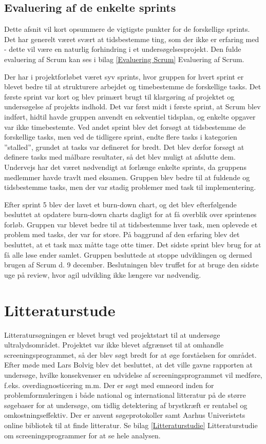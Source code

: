 \subsection{Evaluering af de enkelte sprints} 
Dette afsnit vil kort opsummere de vigtigste punkter for de forskellige sprints. Det har generelt været svært at tidsbestemme ting, som der ikke er erfaring med - dette vil være en naturlig forhindring i et undersøgelsesprojekt. Den fulde evaluering af Scrum kan ses i bilag \ref{Evaluering Scrum} Evaluering af Scrum.

Der har i projektforløbet været syv sprints, hvor gruppen for hvert sprint er blevet bedre til at strukturere arbejdet og timebestemme de forskellige tasks. Det første sprint var kort og blev primært brugt til klargøring af projektet og undersøgelse af projekts indhold. Det var først midt i første sprint, at Scrum blev indført, hidtil havde gruppen anvendt en sekventiel tidsplan, og enkelte opgaver var ikke timebestemte. Ved andet sprint blev det forsøgt at tidsbestemme de forskellige tasks, men ved de tidligere sprint, endte flere tasks i kategorien ”stalled”, grundet at tasks var defineret for bredt. Det blev derfor forsøgt at definere tasks med målbare resultater, så det blev muligt at afslutte dem. Undervejs har det været nødvendigt at forlænge enkelte sprints, da gruppens medlemmer havde travlt med eksamen. Gruppen blev bedre til at fuldende og tidsbestemme tasks, men der var stadig problemer med task til implementering. 

Efter sprint 5 blev der lavet et burn-down chart, og det blev efterfølgende besluttet at opdatere burn-down charts dagligt for at få overblik over sprintenes forløb. Gruppen var blevet bedre til at tidsbestemme hver task, men oplevede et problem med tasks, der var for store. På baggrund af den erfaring blev det besluttet, at et task max måtte tage otte timer. Det sidste sprint blev brug for at få alle løse ender samlet. Gruppen besluttede at stoppe udviklingen og dermed brugen af Scrum d. 9 december. Beslutningen blev truffet for at bruge den sidste uge på review, hvor agil udvikling ikke længere var nødvendig. 
 
\section{Litteraturstude}
Litteratursøgningen er blevet brugt ved projektstart til at undersøge ultralydsområdet. Projektet var ikke blevet afgrænset til at omhandle screeningsprogrammet, så der blev søgt bredt for at øge forståelsen for området. Efter møde med Lars Bolvig blev det besluttet, at det ville gavne rapporten at undersøge, hvilke konsekvenser en udvidelse af screeningsprogrammet vil medføre, f.eks. overdiagnosticering m.m. Der er søgt med emneord inden for problemformuleringen i både national og international litteratur på de større søgebaser for at undersøge, om tidlig detektering af brystkræft er rentabel og omkostningseffektiv. Der er anvent søgeprotokoller samt Aarhus Univeristets online bibliotek til at finde litteratur. Se bilag \ref{Litteraturstudie} Litteraturstudie om screeningsprogrammer for at se hele analysen. 

